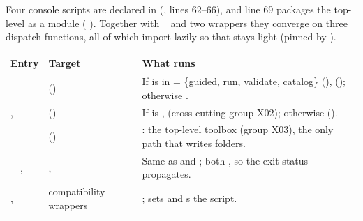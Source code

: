 Four console scripts are declared in  (, lines 62--66), and line 69 packages the top-level  as a module ( \code{=} \code{["main"]}). Together with ~ and two wrappers they converge on three dispatch functions, all of which import lazily so that  stays light (pinned by ).

{\footnotesize
\begin{longtable}{P{3.6cm}P{4.3cm}P{7.6cm}}
\toprule
Entry & Target & What runs \\
\midrule
\endhead
{} &  () & If  is in  = \{guided, run, validate, catalog\} (),  (); otherwise . \\
,  &  () & If  is ,  (cross-cutting group X02); otherwise  (). \\
 &  () & : the top-level  toolbox (group X03), the only path that writes  folders. \\
~~, ~~ & ,  & Same as  and ; both  , so the exit status propagates. \\
,  & compatibility wrappers & ;  sets  and s the script. \\
\bottomrule
\end{longtable}}

